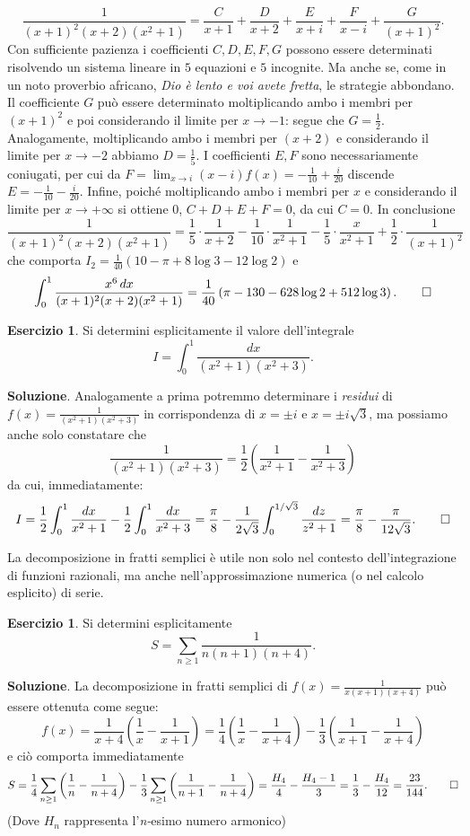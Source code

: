 \documentclass[a4paper,twoside]{article}
\theoremstyle{definition}
\newtheorem{ex}[theorem]{Esercizio}
\numberwithin{theorem}{section}
\begin{document}
$$ \frac{1}{(x+1)^2(x+2)(x^2+1)}=\frac{C}{x+1}+\frac{D}{x+2}+\frac{E}{x+i}+\frac{F}{x-i}+\frac{G}{(x+1)^2}.$$
Con sufficiente pazienza i coefficienti $C,D,E,F,G$ possono essere determinati risolvendo un sistema lineare in $5$ equazioni e $5$ incognite. Ma anche se, come in un noto proverbio africano, \emph{Dio è lento e voi avete fretta}, le strategie abbondano. Il coefficiente $G$ può essere determinato moltiplicando ambo i membri per $(x+1)^2$ e poi considerando il limite per $x\to -1$: segue che $G=\frac{1}{2}$. Analogamente, moltiplicando ambo i membri per $(x+2)$ e considerando il limite per $x\to -2$ abbiamo $D=\frac{1}{5}$. I coefficienti $E,F$ sono necessariamente coniugati, per cui da $F=\lim_{x\to i}(x-i)f(x)=-\frac{1}{10}+\frac{i}{20}$ discende $E=-\frac{1}{10}-\frac{i}{20}$. Infine, poiché moltiplicando ambo i membri per $x$ e considerando il limite per $x\to +\infty$ si ottiene $0$, $C+D+E+F=0$, da cui $C=0$. In conclusione 
$$ \frac{1}{(x+1)^2(x+2)(x^2+1)} = \frac{1}{5}\cdot\frac{1}{x+2}-\frac{1}{10}\cdot\frac{1}{x^2+1}-\frac{1}{5}\cdot\frac{x}{x^2+1}+\frac{1}{2}\cdot\frac{1}{(x+1)^2} $$
che comporta $I_2=\frac{1}{40}\left(10-\pi+8\log 3-12\log 2\right)$ e 
$$ \int_{0}^{1}\frac{x^6\,dx}{(x+1)^2(x+2)(x^2+1)}=\frac{1}{40}\left(\pi-130-628\log 2+512\log 3\right).\qed $$
\begin{ex} Si determini esplicitamente il valore dell'integrale 
$$ I=\int_{0}^{1}\frac{dx}{(x^2+1)(x^2+3)}. $$
\end{ex}
\textbf{Soluzione}. Analogamente a prima potremmo determinare i \emph{residui} di $f(x)=\frac{1}{(x^2+1)(x^2+3)}$ in corrispondenza di $x=\pm i$ e $x=\pm i\sqrt{3}$, ma possiamo anche solo constatare che 
$$ \frac{1}{(x^2+1)(x^2+3)} = \frac{1}{2}\left(\frac{1}{x^2+1}-\frac{1}{x^2+3}\right) $$
da cui, immediatamente:
$$ I = \frac{1}{2}\int_{0}^{1}\frac{dx}{x^2+1}-\frac{1}{2}\int_{0}^{1}\frac{dx}{x^2+3}=\frac{\pi}{8}-\frac{1}{2\sqrt{3}}\int_{0}^{1/\sqrt{3}}\frac{dz}{z^2+1} = \frac{\pi}{8}-\frac{\pi}{12\sqrt{3}}.\qed$$

La decomposizione in fratti semplici è utile non solo nel contesto dell'integrazione di funzioni razionali, ma anche nell'approssimazione numerica (o nel calcolo esplicito) di serie.

\begin{ex} Si determini esplicitamente 
$$ S=\sum_{n\geq 1}\frac{1}{n(n+1)(n+4)}.$$
\end{ex}
\textbf{Soluzione}. La decomposizione in fratti semplici di $f(x)=\frac{1}{x(x+1)(x+4)}$ può essere ottenuta come segue:
$$ f(x)=\frac{1}{x+4}\left(\frac{1}{x}-\frac{1}{x+1}\right) = \frac{1}{4}\left(\frac{1}{x}-\frac{1}{x+4}\right)-\frac{1}{3}\left(\frac{1}{x+1}-\frac{1}{x+4}\right) $$
e ciò comporta immediatamente 
$$ S = \frac{1}{4}\sum_{n\geq 1}\left(\frac{1}{n}-\frac{1}{n+4}\right)-\frac{1}{3}\sum_{n\geq 1}\left(\frac{1}{n+1}-\frac{1}{n+4}\right) = \frac{H_4}{4}-\frac{H_4-1}{3} = \frac{1}{3}-\frac{H_4}{12} = \frac{23}{144}.\qed$$
(Dove $H_n$ rappresenta l'\emph{n-}esimo numero armonico)\\
\end{document}
